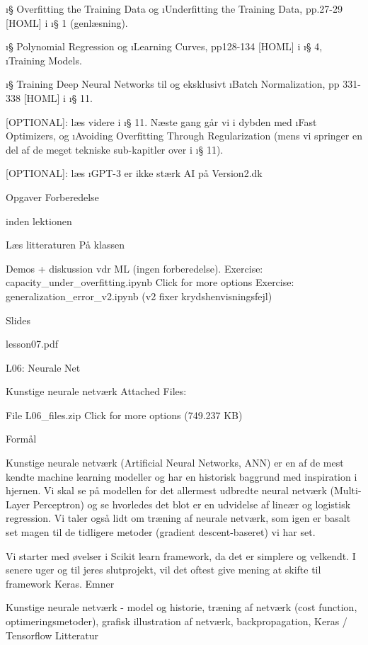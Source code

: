 \i{§ Overfitting the Training Data} og \i{Underfitting the Training Data},
pp.27-29 [HOML] i \i{§ 1} (genlæsning).

\i{§ Polynomial Regression} og \i{Learning Curves}, pp128-134 [HOML] i \i{§
4}, \i{Training Models}.

\i{§ Training Deep Neural Networks} til og eksklusivt \i{Batch Normalization},
pp 331-338 [HOML] i \i{§ 11}.

[OPTIONAL]: læs videre i \i{§ 11}.  Næste gang går vi i dybden med \i{Fast
Optimizers}, og \i{Avoiding Overfitting Through Regularization} (mens vi
springer en del af de meget tekniske sub-kapitler over i \i{§ 11}).

[OPTIONAL]: læs  \i{GPT-3 er ikke stærk AI} på Version2.dk 

Opgaver Forberedelse

inden lektionen

Læs litteraturen
På klassen

        Demos + diskussion vdr ML (ingen forberedelse).
        Exercise:
            capacity_under_overfitting.ipynb Click for more options
        Exercise:
            generalization_error_v2.ipynb (v2 fixer krydshenvisningsfejl)

Slides

lesson07.pdf 




L06: Neurale Net

Kunstige neurale netværk
Attached Files:

    File L06_files.zip Click for more options (749.237 KB) 

Formål

Kunstige neurale netværk (Artificial Neural Networks, ANN) er en af de mest
kendte machine learning modeller og har en historisk baggrund med inspiration i
hjernen.  Vi skal se på modellen for det allermest udbredte neural netværk
(Multi-Layer Perceptron) og se hvorledes det blot er en udvidelse af lineær og
logistisk regression.  Vi taler også lidt om træning af neurale netværk, som
igen er basalt set magen til de tidligere metoder (gradient descent-baseret) vi
har set.

Vi starter med øvelser i Scikit learn framework, da det er simplere og
velkendt.  I senere uger og til jeres slutprojekt, vil det oftest give mening
at skifte til framework Keras.  Emner

Kunstige neurale netværk - model og historie, træning af netværk (cost
function, optimeringsmetoder), grafisk illustration af netværk,
backpropagation, Keras / Tensorflow Litteratur

